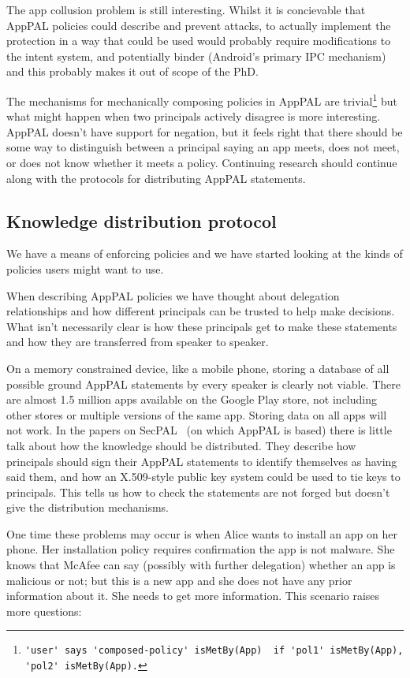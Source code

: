 \documentclass[a4paper]{scrartcl}
\begin{document}
The app collusion problem is still interesting.
Whilst it is concievable that AppPAL policies could describe and prevent attacks, to actually implement the protection in a way that could be used would probably require modifications to the intent system, and potentially binder (Android's primary IPC mechanism) and this probably makes it out of scope of the PhD.

The mechanisms for mechanically composing policies in AppPAL are trivial\footnote{\lstinline{'user' says 'composed-policy' isMetBy(App)  if 'pol1' isMetBy(App), 'pol2' isMetBy(App).}} but what might happen when two principals actively disagree is more interesting.
AppPAL doesn't have support for negation, but it feels right that there should be some way to distinguish between a principal saying an app meets, does not meet, or does not know whether it meets a policy.
Continuing research should continue along with the protocols for distributing AppPAL statements.

\subsection{Knowledge distribution protocol}

We have a means of enforcing policies and we have started looking at the kinds of policies users might want to use.

When describing AppPAL policies we have thought about delegation relationships and how different principals can be trusted to help make decisions.
What isn't necessarily clear is how these principals get to make these statements and how they are transferred from speaker to speaker.

On a memory constrained device, like a mobile phone, storing a database of all possible ground AppPAL statements by every speaker is clearly not viable.
There are almost 1.5 million apps available on the Google Play store, not including other stores or multiple versions of the same app.
Storing data on all apps will not work.
In the papers on SecPAL~\citep{Becker:2006vh,Becker:2009vt} (on which AppPAL is based) there is little talk about how the knowledge should be distributed.
They describe how principals should sign their AppPAL statements to identify themselves as having said them, and how an X.509-style public key system could be used to tie keys to principals.  This tells us how to check the statements are not forged but doesn't give the distribution mechanisms.

One time these problems may occur is when
Alice wants to install an app on her phone.
Her installation policy requires confirmation the app is not malware.
She knows that McAfee can say (possibly with further delegation) whether an app is malicious or not;
  but this is a new app and she does not have any prior information about it.
She needs to get more information.
This scenario raises more questions:
\end{document}
